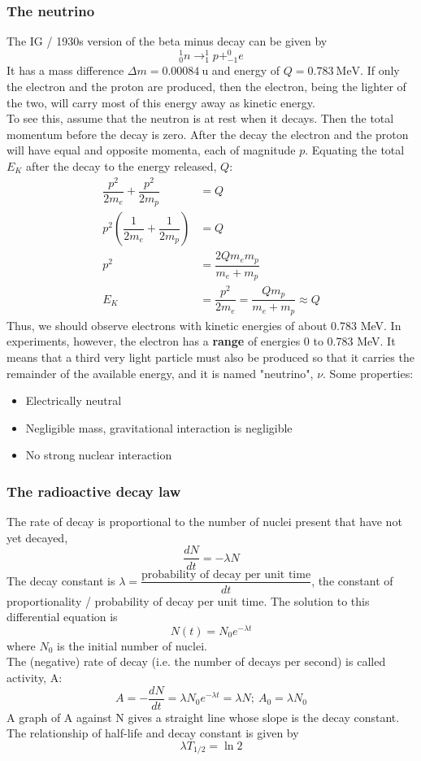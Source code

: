 \subsubsection*{The neutrino}
The IG / 1930s version of the beta minus decay can be given by
\[^1_0n\rightarrow ^1_1p+^0_{-1}e\]
It has a mass difference $\Delta m=0.00084\ \text{u}$ and energy of $Q=0.783\ \text{MeV}$.
If only the electron and the proton are produced, then the electron, being the lighter of the two, will carry most of this energy away as kinetic energy. \\
To see this, assume that the neutron is at rest when it decays. Then the total momentum before the decay is zero. After the decay the electron and the proton will have equal and opposite momenta, each of magnitude $p$. Equating the total $E_K$ after the decay to the energy released, $Q$:
\[
\begin{aligned}
  \dfrac{p^2}{2m_e}+\dfrac{p^2}{2m_p}&=Q\\
  p^2\left(\dfrac{1}{2m_e}+\dfrac{1}{2m_p}\right)&=Q\\
  p^2&=\dfrac{2Qm_em_p}{m_e+m_p}\\
  E_K&=\dfrac{p^2}{2m_e}=\dfrac{Qm_p}{m_e+m_p}\approx Q
\end{aligned}\]
Thus, we should observe electrons with kinetic energies of about 0.783 MeV. In experiments, however, the electron has a \textbf{range} of energies 0 to 0.783 MeV.
It means that a third very light particle must also be produced so that it carries the remainder of the available energy, and it is named "neutrino", $\nu$. Some properties:
\begin{itemize}
  \item Electrically neutral
  \item Negligible mass, gravitational interaction is negligible
  \item No strong nuclear interaction
\end{itemize}
\subsubsection*{The radioactive decay law}
The rate of decay is proportional to the number of nuclei present that have not yet decayed,
\[\dfrac{dN}{dt}=-\lambda N\]
The decay constant is $\lambda=\dfrac{\text{probability of decay per unit time}}{dt}$, the constant of proportionality / probability of decay per unit time. The solution to this differential equation is
\[N(t)=N_0e^{-\lambda t}\]
where $N_0$ is the initial number of nuclei.\\
The (negative) rate of decay (i.e. the number of decays per second) is called activity, A:
\[A=-\dfrac{dN}{dt}=\lambda N_0e^{-\lambda t}=\lambda N;\ A_0=\lambda N_0\]
A graph of A against N gives a straight line whose slope is the decay constant.\\
The relationship of half-life and decay constant is given by
\[\lambda T_{1/2}=\ln 2\]
